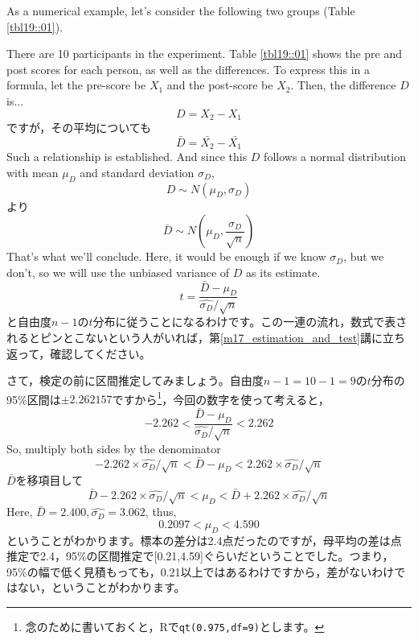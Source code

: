 \documentclass{ltjsbook}
\begin{document}
As a numerical example, let's consider the following two groups (Table \ref{tbl19::01}).

There are 10 participants in the experiment. Table \ref{tbl19::01} shows the pre and post scores for each person, as well as the differences. To express this in a formula, let the pre-score be $X_1$ and the post-score be $X_2$. Then, the difference $D$ is...
\[ D = X_2 - X_1 \]
ですが，その平均についても
\[ \bar{D} = \bar{X_2} - \bar{X_1} \]
Such a relationship is established. And since this $D$ follows a normal distribution with mean $\mu_D$ and standard deviation $\sigma_D$,
\[ D \sim N(\mu_D,\sigma_D)\]
より
\[ \bar{D} \sim N(\mu_D,\frac{\sigma_D}{\sqrt{n}}) \]
That's what we'll conclude. Here, it would be enough if we know $\sigma_D$, but we don't, so we will use the unbiased variance of $D$ as its estimate.
\[ t = \frac{\bar{D}-\mu_D}{\hat{\sigma_D}/\sqrt{n}} \]
と自由度$n-1$の$t$分布に従うことになるわけです。この一連の流れ，数式で表されるとピンとこないという人がいれば，第\ref{m17_estimation_and_test}講に立ち返って，確認してください。

さて，検定の前に区間推定してみましょう。自由度$n-1=10-1=9$の$t$分布の95\%区間は$\pm 2.262157$ですから\footnote{念のために書いておくと，Rで\texttt{qt(0.975,df=9)}とします。}，今回の数字を使って考えると，
\[ -2.262 < \frac{\bar{D}-\mu_D}{\hat{\sigma_D}/\sqrt{n}} < 2.262 \]
So, multiply both sides by the denominator
\[ -2.262 \times \hat{\sigma_D}/\sqrt{n} < \bar{D}-\mu_D < 2.262 \times \hat{\sigma_D}/\sqrt{n} \]
$\bar{D}$を移項目して
\[ \bar{D}-2.262 \times \hat{\sigma_D}/\sqrt{n} < \mu_D < \bar{D}+2.262\times \hat{\sigma_D}/\sqrt{n} \]
Here, $\bar{D} = 2.400, \hat{\sigma_D} = 3.062$, thus,
\[ 0.2097 < \mu_D < 4.590 \]
ということがわかります。標本の差分は2.4点だったのですが，母平均の差は点推定で2.4，95\%の区間推定で[0.21,4.59]ぐらいだということでした。つまり，95\%の幅で低く見積もっても，0.21以上ではあるわけですから，差がないわけではない，ということがわかります。
\end{document}
